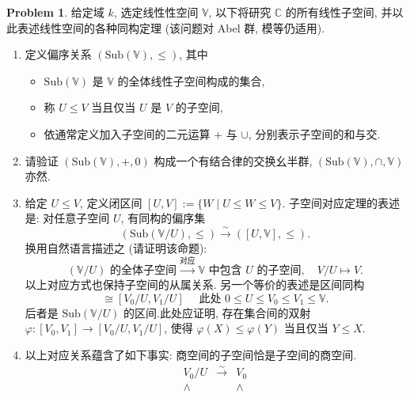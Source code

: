\documentclass{MainStyle}
\theoremstyle{definition}
\newtheorem{problem}{Problem}
\begin{document}
\begin{problem}
给定域 $k$, 选定线性性空间 $\mathbb V$, 以下将研究 $\mathbb C$ 的所有线性子空间, 并以此表述线性空间的各种同构定理 (该问题对 Abel 群, 模等仍适用).
\begin{enumerate}
    \item 定义偏序关系 $(\mathrm{Sub}(\mathbb V),\leq )$, 其中
          \begin{itemize}
              \item $\mathrm{Sub}(\mathbb V)$ 是 $\mathbb V$ 的全体线性子空间构成的集合,
              \item 称 $U\leq V$ 当且仅当 $U$ 是 $V$ 的子空间,
              \item 依通常定义加入子空间的二元运算 $+$ 与 $\cup$, 分别表示子空间的和与交.
          \end{itemize}
    \item 请验证 $(\mathrm{Sub}(\mathbb V),+,0)$ 构成一个有结合律的交换幺半群, $(\mathrm{Sub}(\mathbb V),\cap,\mathbb V)$ 亦然.
    \item 给定 $U\leq V$, 定义闭区间 $[U,V]:=\{W\mid U\leq W\leq V\}$. 子空间对应定理的表述是: 对任意子空间 $U$, 有同构的偏序集
          \begin{equation}
              (\mathrm{Sub}(\mathbb V/U),\leq)\overset{\sim}\longrightarrow ([U,\mathbb V],\leq ).
          \end{equation}
          换用自然语言描述之 (请证明该命题):
          \begin{equation}
              (\mathbb V/U)\text{ 的全体子空间}\overset{\text{对应}}\longrightarrow \mathbb V\text{ 中包含 }U\text{ 的子空间},\quad V/U\mapsto V.
          \end{equation}
          以上对应方式也保持子空间的从属关系. 另一个等价的表述是区间同构
          \begin{equation}
              [V_0,V_1]\cong [V_0/U,V_1/U]\quad\text{ 此处 } 0\leq U\leq V_0\leq V_1\leq \mathbb V.
          \end{equation}
          后者是 $\mathrm{Sub}(\mathbb V/U)$ 的区间.此处应证明, 存在集合间的双射 $\varphi: [V_0,V_1]\to  [V_0/U,V_1/U]$, 使得 $\varphi(X)\leq \varphi(Y)$ 当且仅当 $Y\leq X$.
    \item 以上对应关系蕴含了如下事实: 商空间的子空间恰是子空间的商空间.
          \begin{equation}
              \begin{matrix}
                  V_0/U  & \overset \sim\to & V_0    \\
                  \wedge &                  & \wedge \\

\end{matrix}
\end{equation}
\end{enumerate}
\end{problem}
\end{document}
